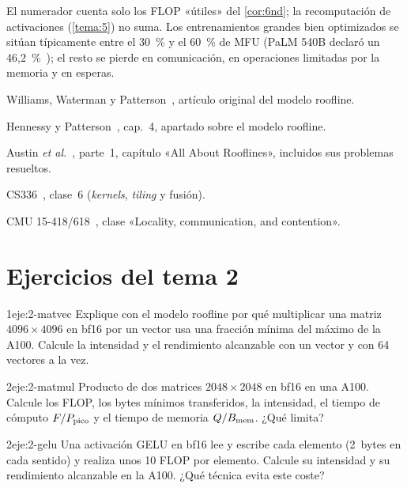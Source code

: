 El numerador cuenta solo los FLOP «útiles» del \cref{cor:6nd}; la recomputación de activaciones (\cref{tema:5}) no suma. Los entrenamientos grandes bien optimizados se sitúan típicamente entre el 30~\% y el 60~\% de MFU (PaLM 540B declaró un 46{,}2~\%~\cite[§4.1]{palm}); el resto se pierde en comunicación, en operaciones limitadas por la memoria y en esperas.

\begin{lecturas}
\item Williams, Waterman y Patterson~\cite{roofline}, artículo original del modelo roofline.
\item Hennessy y Patterson~\cite{hp}, cap.~4, apartado sobre el modelo roofline.
\item Austin \emph{et al.}~\cite{scaling}, parte~1, capítulo «All About Rooflines», incluidos sus problemas resueltos.
\item CS336~\cite{cs336}, clase~6 (\emph{kernels}, \emph{tiling} y fusión).
\item CMU 15-418/618~\cite{cmu418}, clase «Locality, communication, and contention».
\end{lecturas}

\section*{Ejercicios del tema 2}

\begin{ejercicio}{1}{eje:2-matvec}
Explique con el modelo roofline por qué multiplicar una matriz $4096\times 4096$ en bf16 por un vector usa una fracción mínima del máximo de la A100. Calcule la intensidad y el rendimiento alcanzable con un vector y con 64 vectores a la vez.
\end{ejercicio}

\begin{ejercicio}{2}{eje:2-matmul}
Producto de dos matrices $2048\times 2048$ en bf16 en una A100. Calcule los FLOP, los bytes mínimos transferidos, la intensidad, el tiempo de cómputo $F/P_{\mathrm{pico}}$ y el tiempo de memoria $Q/B_{\mathrm{mem}}$. ¿Qué limita?
\end{ejercicio}

\begin{ejercicio}{2}{eje:2-gelu}
Una activación GELU en bf16 lee y escribe cada elemento (2~bytes en cada sentido) y realiza unos 10 FLOP por elemento. Calcule su intensidad y su rendimiento alcanzable en la A100. ¿Qué técnica evita este coste?
\end{ejercicio}

